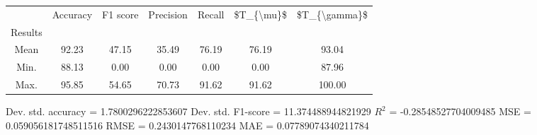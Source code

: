 \begin{tabular}{|c|c|c|c|c|c|c|}
\toprule
{} &  Accuracy &  F1 score &  Precision &  Recall &  \$T\_\{\textbackslash mu\}\$ &  \$T\_\{\textbackslash gamma\}\$ \\
Results &           &           &            &         &            &               \\
\hline
Mean    &     92.23 &     47.15 &      35.49 &   76.19 &      76.19 &         93.04 \\
Min.    &     88.13 &      0.00 &       0.00 &    0.00 &       0.00 &         87.96 \\
Max.    &     95.85 &     54.65 &      70.73 &   91.62 &      91.62 &        100.00 \\
\bottomrule
\end{tabular}

 Dev. std. accuracy = 1.7800296222853607
 Dev. std. F1-score = 11.374488944821929
 $R^2$ = -0.28548527704009485
 MSE = 0.059056181748511516
 RMSE = 0.2430147768110234
 MAE = 0.07789074340211784